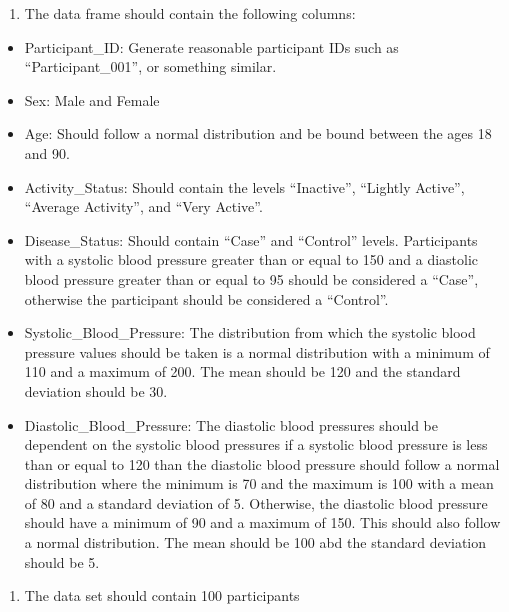 \documentclass[
]{article}
\providecommand{\tightlist}{%
  \setlength{\itemsep}{0pt}\setlength{\parskip}{0pt}}
\begin{document}
\begin{enumerate}
\def\labelenumi{\alph{enumi})}
\tightlist
\item
  The data frame should contain the following columns:
\end{enumerate}

\begin{itemize}
\tightlist
\item
  Participant\_ID: Generate reasonable participant IDs such as
  ``Participant\_001'', or something similar.
\item
  Sex: Male and Female
\item
  Age: Should follow a normal distribution and be bound between the ages
  18 and 90.
\item
  Activity\_Status: Should contain the levels ``Inactive'', ``Lightly
  Active'', ``Average Activity'', and ``Very Active''.
\item
  Disease\_Status: Should contain ``Case'' and ``Control'' levels.
  Participants with a systolic blood pressure greater than or equal to
  150 and a diastolic blood pressure greater than or equal to 95 should
  be considered a ``Case'', otherwise the participant should be
  considered a ``Control''.
\item
  Systolic\_Blood\_Pressure: The distribution from which the systolic
  blood pressure values should be taken is a normal distribution with a
  minimum of 110 and a maximum of 200. The mean should be 120 and the
  standard deviation should be 30.
\item
  Diastolic\_Blood\_Pressure: The diastolic blood pressures should be
  dependent on the systolic blood pressures if a systolic blood pressure
  is less than or equal to 120 than the diastolic blood pressure should
  follow a normal distribution where the minimum is 70 and the maximum
  is 100 with a mean of 80 and a standard deviation of 5. Otherwise, the
  diastolic blood pressure should have a minimum of 90 and a maximum of
  150. This should also follow a normal distribution. The mean should be
  100 abd the standard deviation should be 5.
\end{itemize}

\begin{enumerate}
\def\labelenumi{\alph{enumi})}
\setcounter{enumi}{1}
\tightlist
\item
  The data set should contain 100 participants
\end{enumerate}
\end{document}
